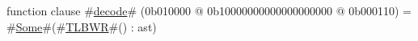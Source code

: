 function clause #\hyperref[zdecode]{decode}# (0b010000 @ 0b10000000000000000000 @ 0b000110) = #\hyperref[zSome]{Some}#(#\hyperref[zTLBWR]{TLBWR}#() : ast)
